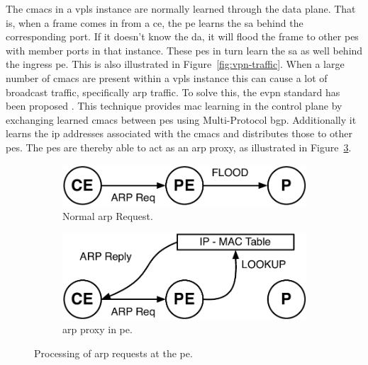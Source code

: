 The \acp{cmac} in a \ac{vpls} instance are normally learned through the data plane. That is, when a frame comes in from a \ac{ce}, the \ac{pe} learns the \ac{sa} behind the corresponding port. If it doesn't know the \ac{da}, it will flood the frame to other \acp{pe} with member ports in that instance. These \acp{pe} in turn learn the \ac{sa} as well behind the ingress \ac{pe}. This is also illustrated in Figure~\ref{fig:vpn-traffic}. When a large number of \acp{cmac} are present within a \ac{vpls} instance this can cause a lot of broadcast traffic, specifically \ac{arp} traffic. To solve this, the \ac{evpn} standard has been proposed \cite{evpn}. This technique provides \ac{mac} learning in the control plane by exchanging learned \acp{cmac} between \acp{pe} using Multi-Protocol \ac{bgp}. Additionally it learns the \ac{ip} addresses associated with the \acp{cmac} and distributes those to other \acp{pe}. The \acp{pe} are thereby able to act as an \ac{arp} proxy, as illustrated in Figure~\ref{fig:arp-proxy}.

\begin{figure}[!h]
	\centering
	\begin{subfigure}[b]{0.3\textwidth}
		\centering
		\includegraphics[width=\textwidth]{./includes/arp-no-proxy.pdf}
		\caption{Normal \acs{arp} Request.}
		\label{fig:arp-no-proxy}
	\end{subfigure}\hspace*{1cm}
	\begin{subfigure}[b]{0.3\textwidth}
	\centering
		\includegraphics[width=\textwidth]{./includes/arp-proxy.pdf}
		\caption{\acs{arp} proxy in \ac{pe}.}
		\label{fig:arp-proxy}
	\end{subfigure}
	\caption{Processing of \acs{arp} requests at the \ac{pe}.}
\end{figure}

